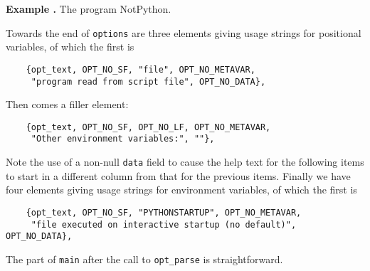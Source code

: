 \documentclass{article}
\newcounter{exnum}
\newenvironment{example}[1]
{\par\smallskip\noindent\refstepcounter{exnum}\textbf{Example
    \theexnum.} The program #1.\par\nopagebreak}
{\par\smallskip}
\renewcommand{\tt}{\texttt}
\begin{document}
\begin{example}{NotPython}
  Towards the end of \tt{options} are three elements giving usage
  strings for positional variables, of which the first is
{\small
\begin{verbatim}
    {opt_text, OPT_NO_SF, "file", OPT_NO_METAVAR,
     "program read from script file", OPT_NO_DATA},
\end{verbatim}} 
\noindent  Then comes a filler element:
{\small
\begin{verbatim}
    {opt_text, OPT_NO_SF, OPT_NO_LF, OPT_NO_METAVAR,
     "Other environment variables:", ""},
\end{verbatim}}
  \noindent Note the use of a non-null \tt{data} field to cause the
  help text for the following items to start in a different column
  from that for the previous items. Finally we have four elements
  giving usage strings for environment variables, of which the first is
{\small
\begin{verbatim}
    {opt_text, OPT_NO_SF, "PYTHONSTARTUP", OPT_NO_METAVAR,
     "file executed on interactive startup (no default)", OPT_NO_DATA},
\end{verbatim}}
  \noindent The part of \tt{main} after the call to \tt{opt\_parse} is
  straightforward.
\end{example}
\end{document}
